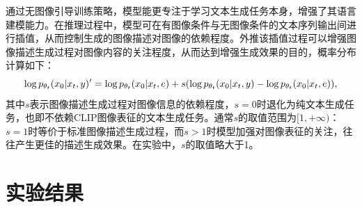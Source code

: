 通过无图像引导训练策略，模型能更专注于学习文本生成任务本身，增强了其语言建模能力。在推理过程中，模型可在有图像条件与无图像条件的文本序列输出间进行插值，从而控制生成的图像描述对图像的依赖程度。外推该插值过程可以增强图像描述生成过程对图像内容的关注程度，从而达到增强生成效果的目的，概率分布计算如下：
\begin{equation}
    \log p_{\theta_t}({x}_{0} | {x}_{t}, {y})'=\log p_{\theta_t}({x}_{0} | {x}_{t}, {e}) + \\ s(\log p_{\theta_t}({x}_{0} | {x}_{t}, {y}) - \log p_{\theta_t}({x}_{0} | {x}_{t}, {e})),
\end{equation}
其中$s$表示图像描述生成过程对图像信息的依赖程度，$s=0$时退化为纯文本生成任务，也即不依赖CLIP图像表征的文本生成任务。通常$s$的取值范围为$[1, +\infty)$：$s=1$时等价于标准图像描述生成过程，而$s>1$时模型加强对图像表征的关注，往往产生更佳的描述生成效果。在实验中，$s$的取值略大于1。


\section{实验结果}
\label{sec:ddcap-result}
